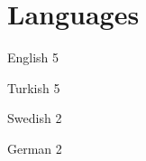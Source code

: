 
\section{Languages}

    \itemizeCVBegin

        \languageItem
            {English}
            {5}
            
        \languageItem
            {Turkish}
            {5}
            
        \languageItem
            {Swedish}
            {2}
            
        \languageItem
            {German}
            {2}
            
    \itemizeCVEnd

